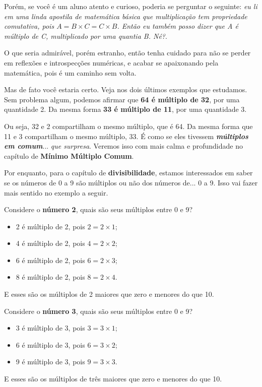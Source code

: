 Porém, se você é um aluno atento e curioso, poderia se perguntar o seguinte: \textit{eu li em uma linda apostila de matemática básica que multiplicação tem propriedade comutativa, pois \(A=B\times C = C\times B\). Então eu também posso dizer que A é múltiplo de C, multiplicado por uma quantia B. Né?}. 

O que seria admirável, porém estranho, então tenha cuidado para não se perder em reflexões e introspecções numéricas, e acabar se apaixonando pela matemática, pois é um caminho sem volta.

Mas de fato você estaria certo. Veja nos dois últimos exemplos que estudamos. Sem problema algum, podemos afirmar que \textbf{64 é múltiplo de 32}, por uma quantidade 2. Da mesma forma \textbf{33 é múltiplo de 11}, por uma quantidade 3.

Ou seja, 32 e 2 compartilham o mesmo múltiplo, que é 64. Da mesma forma que 11 e 3 compartilham o mesmo múltiplo, 33. É como se eles tivessem \textit{\textbf{múltiplos em comum}}... \textit{que surpresa}. Veremos isso com mais calma e profundidade no capítulo de \textbf{Mínimo Múltiplo Comum}.

Por enquanto, para o capítulo de \textbf{divisibilidade}, estamos interessados em saber se os números de 0 a 9 são múltiplos ou não dos números de... 0 a 9. Isso vai fazer mais sentido no exemplo a seguir.

\begin{exemplo}
    Considere o \textbf{número 2}, quais são seus múltiplos entre 0 e 9?

    \begin{itemize}
        \item 2 é múltiplo de 2, pois \(2=2\times1\);
        \item 4 é múltiplo de 2, pois \(4=2\times2\);
        \item 6 é múltiplo de 2, pois \(6=2\times3\);
        \item 8 é múltiplo de 2, pois \(8=2\times4\).
    \end{itemize}

    E esses são os múltiplos de 2 maiores que zero e menores do que 10.
\end{exemplo}

\begin{exemplo}
    Considere o \textbf{número 3}, quais são seus múltiplos entre 0 e 9?

    \begin{itemize}
        \item 3 é múltiplo de 3, pois \(3=3\times1\);
        \item 6 é múltiplo de 3, pois \(6=3\times2\);
        \item 9 é múltiplo de 3, pois \(9=3\times3\).
    \end{itemize}

    E esses são os múltiplos de três maiores que zero e menores do que 10.
\end{exemplo}

